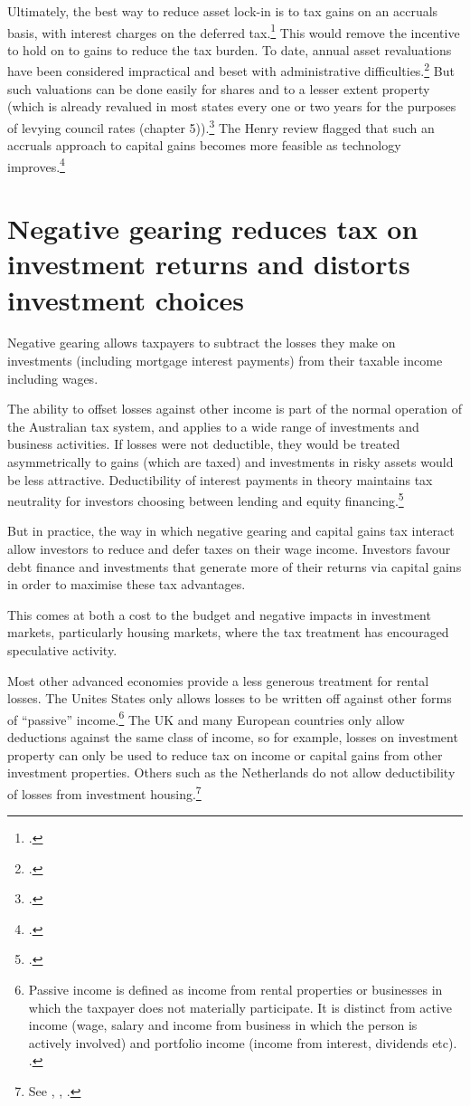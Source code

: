\documentclass{grattan}\usepackage[]{graphicx}\usepackage[]{color}
\begin{document}
Ultimately, the best way to reduce asset lock-in is to tax gains on an accruals basis, with interest charges on the deferred tax.\footcite[pp.~11-14]{Burman2009} This would remove the incentive to hold on to gains to reduce the tax burden. To date, annual asset revaluations have been considered impractical and beset with administrative difficulties.\footcites{OECD2006a}{Commission2004} But such valuations can be done easily for shares and to a lesser extent property (which is already revalued in most states every one or two years for the purposes of levying council rates (chapter 5)).\footcites{Burman2009}[p.~12]{Ingles2009} The Henry review flagged that such an accruals approach to capital gains becomes more feasible as technology improves.\footcite[p.~64]{Treasury2010} 


\section{Negative gearing reduces tax on investment returns and distorts investment choices }\label{sec:negative_gearing_provides}
Negative gearing allows taxpayers to subtract the losses they make on investments (including mortgage interest payments) from their taxable income including wages. 

The ability to offset losses against other income is part of the normal operation of the Australian tax system, and applies to a wide range of investments and business activities. If losses were not deductible, they would be treated asymmetrically to gains (which are taxed) and investments in risky assets would be less attractive. Deductibility of interest payments in theory maintains tax neutrality for investors choosing between lending and equity financing.\footcite{Fane2004}  

But in practice, the way in which negative gearing and capital gains tax interact allow investors to reduce and defer taxes on their wage income. Investors favour debt finance and investments that generate more of their returns via capital gains in order to maximise these tax advantages. 

This comes at both a cost to the budget and negative impacts in investment markets, particularly housing markets, where the tax treatment has encouraged speculative activity. 

Most other advanced economies provide a less generous treatment for rental losses. The Unites States only allows losses to be written off against other forms of ``passive'' income.\footnote{Passive income is defined as income from rental properties or businesses in which the taxpayer does not materially participate. It is distinct from active income (wage, salary and income from business in which the person is actively involved) and portfolio income (income from interest, dividends etc). \textcite{IRS2015}.}  The UK and many European countries only allow deductions against the same class of income, so for example, losses on investment property can only be used to reduce tax on income or capital gains from other investment properties. Others such as the Netherlands do not allow deductibility of losses from investment housing.\footnote{See \textcite[p.~43]{RBA2014}, \textcite[p.~86]{Commission2004}, \textcite[pp.~92-95]{ODonnell2005}.}
\end{document}
